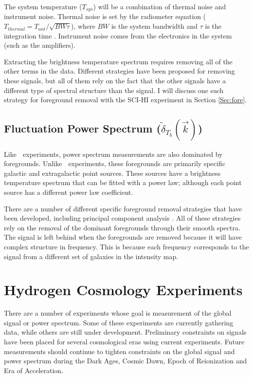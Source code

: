 The system temperature ($T_{sys}$) will be a combination of thermal noise and instrument noise. Thermal noise is set by the radiometer equation ($T_{thermal} = T_{ant}/\sqrt{BW \tau}$), where $BW$ is the system bandwidth and $\tau$ is the integration time \cite{carroll2007}. Instrument noise comes from the electronics in the system (such as the amplifiers). 

Extracting the \cm brightness temperature spectrum requires removing all of the other terms in the data. Different strategies have been proposed for removing these signals, but all of them rely on the fact that the other signals have a different type of spectral structure than the \cm signal. I will discuss one such strategy for foreground removal with the SCI-HI experiment in Section \ref{Sec:fore}. 


\subsection{Fluctuation Power Spectrum ($ \tilde{ \delta}_{T_b}  ( \vec{k} )$)}

Like \avgdtb$\;$ experiments, power spectrum measurements are also dominated by foregrounds. Unlike \avgdtb$\;$ experiments, these foregrounds are primarily specific galactic and extragalactic point sources. These sources have a brightness temperature spectrum that can be fitted with a power law; although each point source has a different power law coefficient. 

There are a number of different specific foreground removal strategies that have been developed, including principal component analysis \cite{masui_2012}\cite{switzer_2013}. All of these strategies rely on the removal of the dominant foregrounds through their smooth spectra. The \cm signal is left behind when the foregrounds are removed because it will have complex structure in frequency. This is because each frequency corresponds to the signal from a different set of galaxies in the intensity map. 



\section{Hydrogen \cm Cosmology Experiments} \label{Sec:cm_expts}

There are a number of experiments whose goal is measurement of the \cm global signal or power spectrum. Some of these experiments are currently gathering data, while others are still under development. Preliminary constraints on \cm signals have been placed for several cosmological eras using current experiments. Future measurements should continue to tighten constraints on the \cm global signal and \cm power spectrum during the Dark Ages, Cosmic Dawn, Epoch of Reionization and Era of Acceleration. 


